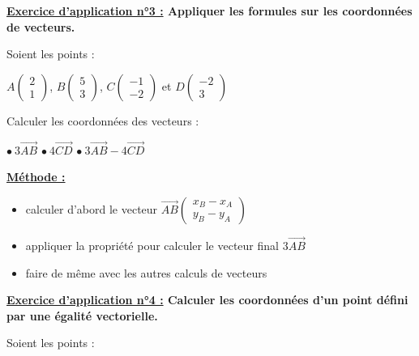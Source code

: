 \documentclass[12pt]{article}
\newcommand*{\Coord}[2]{%
  \ensuremath{
    \begin{pmatrix} 
      #1\\ 
      #2 
    \end{pmatrix}}}
\begin{document}

\begin{mdframed}[
    linewidth=1pt,
    roundcorner=5pt,
    linecolor=RoyalBlue,
    innertopmargin=10pt,
    innerbottommargin=10pt
]
{\color{RoyalBlue}\textbf{\underline{Exercice d'application n°3 :}
Appliquer les formules sur les coordonnées de vecteurs.}}
\vspace{10pt}

Soient les points : 

\vspace{5pt}

$A\Coord{2}{1}$, $B\Coord{5}{3}$, $C\Coord{-1}{-2}$ et $D\Coord{-2}{3}$

\vspace{10pt}

Calculer les coordonnées des vecteurs :
\vspace{5pt}

\hspace{1cm} $\bullet \  3 \overrightarrow{AB}$ \hspace{2cm} $\bullet \ 4 \overrightarrow{CD}$ \hspace{2cm} 
$\bullet \ 3 \overrightarrow{AB} - 4 \overrightarrow{CD}$

\begin{mdframed}[
    linewidth=1pt,
    roundcorner=5pt,
    linecolor=black,
    innertopmargin=10pt,
    innerbottommargin=10pt,
    backgroundcolor=gray!15
]
\underline{\textbf{Méthode :}}
\begin{itemize}
    \item calculer d'abord le vecteur
    $\overrightarrow{AB} \Coord{x_B-x_A}{y_B-y_A}$
    \item appliquer la propriété pour calculer le vecteur final 
    $3 \overrightarrow{AB}$
    \item faire de même avec les autres calculs de vecteurs
\end{itemize}
\end{mdframed}

\vspace{1cm}
\newpage
{\color{RoyalBlue}\textbf{\underline{Exercice d'application n°4 :}
Calculer les coordonnées d'un point défini par une égalité 
vectorielle.}}
\vspace{10pt}

Soient les points : 

\vspace{5pt}


\end{mdframed}
\end{document}
